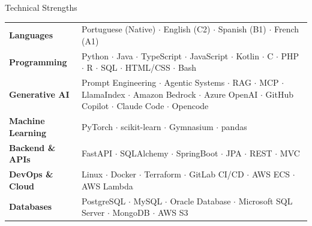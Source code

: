 \documentclass[
	11pt, %
]{cv} %
\begin{document}
\newpage
\begin{rSection}{Technical Strengths}

	\begin{table}[h!]
		
		\centering
		\begin{tabularx}{\textwidth}{@{\hspace{1.5em}} @{} >{\bfseries}X @{\hspace{3ex}}p{68ex} @{\vspace{5pt}}}
			Languages           & Portuguese (Native) $\cdot$ English (C2) $\cdot$ Spanish (B1) $\cdot$ French (A1) \\
			Programming         & Python $\cdot$ Java $\cdot$ TypeScript $\cdot$ JavaScript $\cdot$ Kotlin $\cdot$ C $\cdot$ PHP $\cdot$ R $\cdot$ SQL $\cdot$ HTML/CSS $\cdot$ Bash \\
			Generative AI       & Prompt Engineering $\cdot$ Agentic Systems $\cdot$ RAG $\cdot$ MCP $\cdot$ LlamaIndex $\cdot$ Amazon Bedrock $\cdot$ Azure OpenAI $\cdot$ GitHub Copilot $\cdot$ Claude Code $\cdot$ Opencode \\
			Machine Learning    & PyTorch $\cdot$ scikit-learn $\cdot$ Gymnasium $\cdot$ pandas \\
			Backend \& APIs     & FastAPI $\cdot$ SQLAlchemy $\cdot$ SpringBoot $\cdot$ JPA $\cdot$ REST $\cdot$ MVC \\
			DevOps \& Cloud     & Linux $\cdot$ Docker $\cdot$ Terraform $\cdot$ GitLab CI/CD $\cdot$ AWS ECS $\cdot$ AWS Lambda \\
			Databases           & PostgreSQL $\cdot$ MySQL $\cdot$ Oracle Database $\cdot$ Microsoft SQL Server $\cdot$ MongoDB $\cdot$ AWS S3
		\end{tabularx}
	\end{table}
\end{rSection}

\vspace{-2ex}
\end{document}
